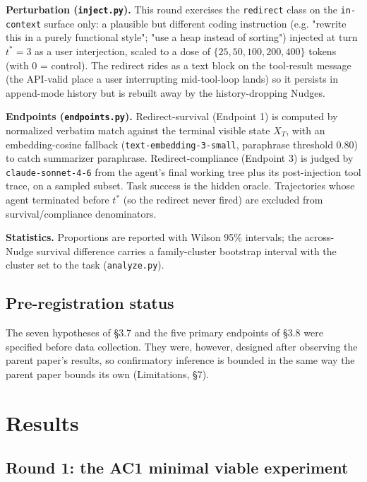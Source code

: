 \documentclass{article}
\theoremstyle{plain}
\theoremstyle{definition}
\begin{document}
\textbf{Perturbation (\texttt{inject.py}).} This round exercises the \texttt{redirect} class on the \texttt{in-context} surface only: a plausible but different coding instruction (e.g. "rewrite this in a purely functional style"; "use a heap instead of sorting") injected at turn $t^*=3$ as a user interjection, scaled to a dose of $\{25, 50, 100, 200, 400\}$ tokens (with $0$ = control). The redirect rides as a text block on the tool-result message (the API-valid place a user interrupting mid-tool-loop lands) so it persists in append-mode history but is rebuilt away by the history-dropping Nudges.

\textbf{Endpoints (\texttt{endpoints.py}).} Redirect-survival (Endpoint 1) is computed by normalized verbatim match against the terminal visible state $X_T$, with an embedding-cosine fallback (\texttt{text-embedding-3-small}, paraphrase threshold $0.80$) to catch summarizer paraphrase. Redirect-compliance (Endpoint 3) is judged by \texttt{claude-sonnet-4-6} from the agent's final working tree plus its post-injection tool trace, on a sampled subset. Task success is the hidden oracle. Trajectories whose agent terminated before $t^*$ (so the redirect never fired) are excluded from survival/compliance denominators.

\textbf{Statistics.} Proportions are reported with Wilson 95\% intervals; the across-Nudge survival difference carries a family-cluster bootstrap interval with the cluster set to the task (\texttt{analyze.py}).

\subsection{Pre-registration status}

The seven hypotheses of §3.7 and the five primary endpoints of §3.8 were specified before data collection. They were, however, designed after observing the parent paper's results, so confirmatory inference is bounded in the same way the parent paper bounds its own (Limitations, §7).


\section{Results}

\subsection{Round 1: the AC1 minimal viable experiment}
\end{document}
